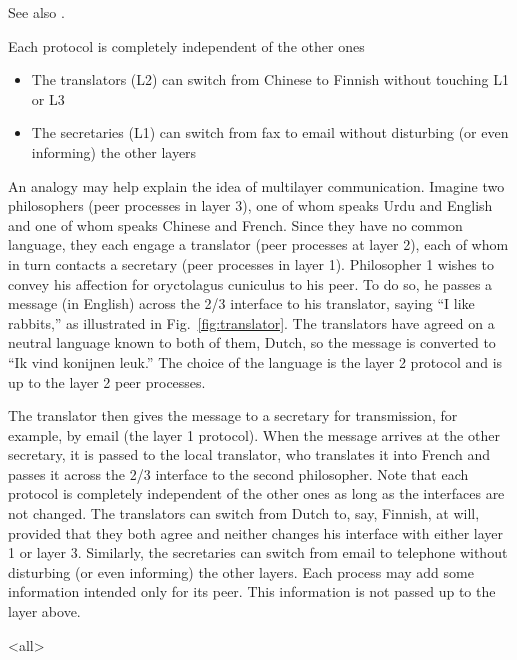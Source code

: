 See also .

\begin{frame}
  \begin{minipage}{.6\linewidth}
    \centering {}%
    \label{fig:translator}%
  \end{minipage}\quad
  \begin{minipage}{.35\linewidth}
    Each protocol is completely independent of the other ones
    \begin{itemize}
    \item The translators (L2) can switch from Chinese to Finnish without touching L1 or
      L3
    \item The secretaries (L1) can switch from fax to email without disturbing (or even
      informing) the other layers
    \end{itemize}
  \end{minipage}
\end{frame}

An analogy may help explain the idea of multilayer communication. Imagine two philosophers
(peer processes in layer 3), one of whom speaks Urdu and English and one of whom speaks
Chinese and French. Since they have no common language, they each engage a translator
(peer processes at layer 2), each of whom in turn contacts a secretary (peer processes in
layer 1). Philosopher 1 wishes to convey his affection for oryctolagus cuniculus to his
peer. To do so, he passes a message (in English) across the 2/3 interface to his
translator, saying ``I like rabbits,'' as illustrated in Fig.~\ref{fig:translator}. The
translators have agreed on a neutral language known to both of them, Dutch, so the message
is converted to ``Ik vind konijnen leuk.'' The choice of the language is the layer 2
protocol and is up to the layer 2 peer processes.

The translator then gives the message to a secretary for transmission, for example, by
email (the layer 1 protocol). When the message arrives at the other secretary, it is
passed to the local translator, who translates it into French and passes it across the 2/3
interface to the second philosopher. Note that each protocol is completely independent of
the other ones as long as the interfaces are not changed. The translators can switch from
Dutch to, say, Finnish, at will, provided that they both agree and neither changes his
interface with either layer 1 or layer 3. Similarly, the secretaries can switch from email
to telephone without disturbing (or even informing) the other layers. Each process may add
some information intended only for its peer. This information is not passed up to the
layer above.

\mode<all>
